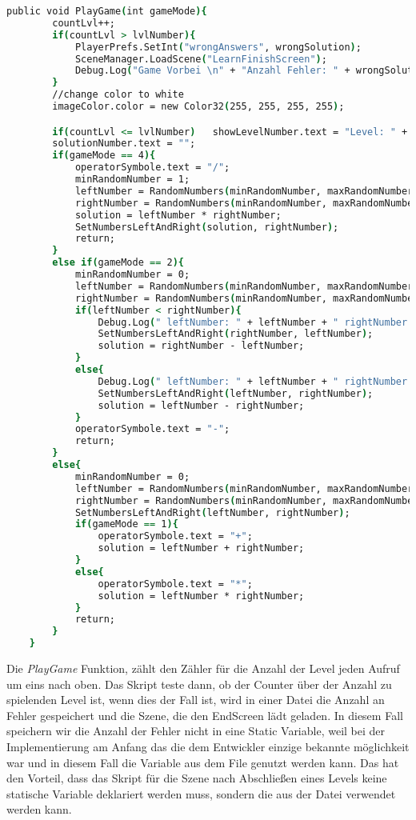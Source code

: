 \begin{lstlisting}[language=csh, caption={MathOperations.cs PlayGame Funktion}]
public void PlayGame(int gameMode){
		countLvl++;
		if(countLvl > lvlNumber){
			PlayerPrefs.SetInt("wrongAnswers", wrongSolution);
			SceneManager.LoadScene("LearnFinishScreen");
			Debug.Log("Game Vorbei \n" + "Anzahl Fehler: " + wrongSolution);
		}
		//change color to white
		imageColor.color = new Color32(255, 255, 255, 255);

		if(countLvl <= lvlNumber)	showLevelNumber.text = "Level: " + countLvl + "/" + lvlNumber;
		solutionNumber.text = "";
		if(gameMode == 4){
			operatorSymbole.text = "/";
			minRandomNumber = 1;
			leftNumber = RandomNumbers(minRandomNumber, maxRandomNumber);
			rightNumber = RandomNumbers(minRandomNumber, maxRandomNumber);
			solution = leftNumber * rightNumber;
			SetNumbersLeftAndRight(solution, rightNumber);
			return;
		}
		else if(gameMode == 2){
			minRandomNumber = 0;
			leftNumber = RandomNumbers(minRandomNumber, maxRandomNumber);
			rightNumber = RandomNumbers(minRandomNumber, maxRandomNumber);
			if(leftNumber < rightNumber){
				Debug.Log(" leftNumber: " + leftNumber + " rightNumber: " + rightNumber + "zweite If");
				SetNumbersLeftAndRight(rightNumber, leftNumber);
				solution = rightNumber - leftNumber;
			}
			else{
				Debug.Log(" leftNumber: " + leftNumber + " rightNumber: " + rightNumber + "zweite If");
				SetNumbersLeftAndRight(leftNumber, rightNumber);
				solution = leftNumber - rightNumber;
			}
			operatorSymbole.text = "-";
			return;
		}
		else{
			minRandomNumber = 0;
			leftNumber = RandomNumbers(minRandomNumber, maxRandomNumber);
			rightNumber = RandomNumbers(minRandomNumber, maxRandomNumber);
			SetNumbersLeftAndRight(leftNumber, rightNumber);
			if(gameMode == 1){
				operatorSymbole.text = "+";
				solution = leftNumber + rightNumber;
			}
			else{
				operatorSymbole.text = "*";
				solution = leftNumber * rightNumber;
			}
			return;
		}
	}
\end{lstlisting}
Die \textit{PlayGame} Funktion, zählt den Zähler für die Anzahl der Level jeden Aufruf um eins nach oben. Das Skript teste dann, ob der Counter über der Anzahl zu spielenden Level ist, wenn dies der Fall ist, wird in einer Datei die Anzahl an Fehler gespeichert und die Szene, die den EndScreen lädt geladen. In diesem Fall speichern wir die Anzahl der Fehler nicht in eine Static Variable, weil bei der Implementierung am Anfang das die dem Entwickler einzige bekannte möglichkeit war und in diesem Fall die Variable aus dem File genutzt werden kann. Das hat den Vorteil, dass das Skript für die Szene nach Abschließen eines Levels keine statische Variable deklariert werden muss, sondern die aus der Datei verwendet werden kann.\\
